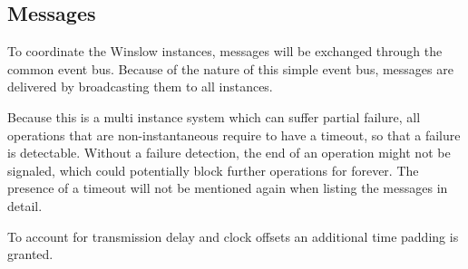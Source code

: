 





\subsection{Messages}

To coordinate the Winslow instances, messages will be exchanged through the common event bus.
Because of the nature of this simple event bus, messages are delivered by broadcasting them to all instances.


Because this is a multi instance system which can suffer partial failure, all operations that are non-instantaneous require to have a timeout, so that a failure is detectable.
Without a failure detection, the end of an operation might not be signaled, which could potentially block further operations for forever.
The presence of a timeout will not be mentioned again when listing the messages in detail.

To account for transmission delay and clock offsets an additional time padding is granted. 




